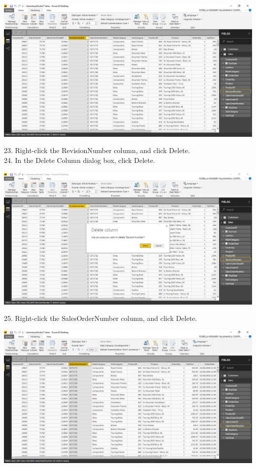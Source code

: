 	\begin{center}
	\includegraphics[width=17cm]{./Imagenes/Ejercicio1/Tarea3/20}
	\end{center}	

23. Right-click the RevisionNumber column, and click Delete.\\
24. In the Delete Column dialog box, click Delete.\\

	\begin{center}
	\includegraphics[width=17cm]{./Imagenes/Ejercicio1/Tarea3/21}
	\end{center}	

25. Right-click the SalesOrderNumber column, and click Delete.\\

	\begin{center}
	\includegraphics[width=17cm]{./Imagenes/Ejercicio1/Tarea3/22}
	\end{center}	


